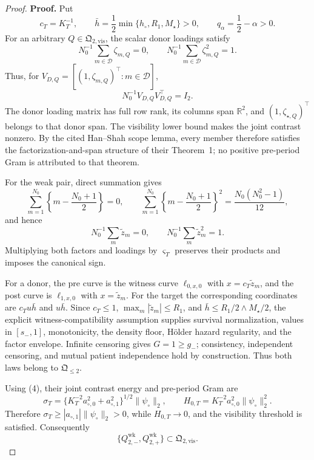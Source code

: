 \documentclass{article}
\begin{document}
\begin{proof}
\textbf{Proof.}
Put
\[
 c_T=K_T^{-1},
 \qquad \bar h=\frac12\min\{h_\circ,R_1,M_\star\}>0,
 \qquad q_\alpha=\frac12-\alpha>0.                       \tag{1}
\]
For an arbitrary \(Q\in\mathfrak Q_{2,\mathrm{vis}}\), the scalar donor loadings satisfy
\[
 N_0^{-1}\sum_{m\in\mathcal D}\zeta_{m,Q}=0,
 \qquad N_0^{-1}\sum_{m\in\mathcal D}\zeta_{m,Q}^2=1. \tag{2}
\]
Thus, for \(V_{D,Q}=[(1,\zeta_{m,Q})^\top:m\in\mathcal D]\),
\[
 N_0^{-1}V_{D,Q}V_{D,Q}^\top=I_2.                       \tag{3}
\]
The donor loading matrix has full row rank, its columns span \(\mathbb R^2\), and \((1,\zeta_{\star,Q})^\top\) belongs to that donor span.  The visibility lower bound makes the joint contrast nonzero.  By the cited Han--Shah scope lemma, every member therefore satisfies the factorization-and-span structure of their Theorem~1; no positive pre-period Gram is attributed to that theorem.

For the weak pair, direct summation gives
\[
 \sum_{m=1}^{N_0}\left\{m-\frac{N_0+1}{2}\right\}=0,
 \qquad
 \sum_{m=1}^{N_0}\left\{m-\frac{N_0+1}{2}\right\}^2
 =\frac{N_0(N_0^2-1)}{12},
\]
and hence
\[
 N_0^{-1}\sum_m\widetilde z_m=0,
 \qquad N_0^{-1}\sum_m\widetilde z_m^2=1.              \tag{4}
\]
Multiplying both factors and loadings by \(\varsigma_T\) preserves their products and imposes the canonical sign.

For a donor, the pre curve is the witness curve \(\ell_{0,x,0}\) with \(x=c_T\widetilde z_m\), and the post curve is \(\ell_{1,x,0}\) with \(x=\widetilde z_m\).  For the target the corresponding coordinates are \(c_Tu\bar h\) and \(u\bar h\).  Since \(c_T\le1\), \(\max_m|\widetilde z_m|\le R_1\), and \(\bar h\le R_1/2\wedge M_\star/2\), the explicit witness-compatibility assumption supplies survival normalization, values in \([s_-,1]\), monotonicity, the density floor, H\"older hazard regularity, and the factor envelope.  Infinite censoring gives \(G=1\ge g_-\); consistency, independent censoring, and mutual patient independence hold by construction.  Thus both laws belong to \(\mathfrak Q_{\le2}\).

Using (4), their joint contrast energy and pre-period Gram are
\[
 \sigma_T=\{K_T^{-2}a_{\circ,0}^2+a_{\circ,1}^2\}^{1/2}
 \|\psi_\circ\|_2,
 \qquad
 H_{0,T}=K_T^{-2}a_{\circ,0}^2\|\psi_\circ\|_2^2.      \tag{5}
\]
Therefore \(\sigma_T\ge|a_{\circ,1}|\|\psi_\circ\|_2>0\), while \(H_{0,T}\to0\), and the visibility threshold is satisfied.  Consequently
\[
 \{Q_{2,-}^{\mathrm{wk}},Q_{2,+}^{\mathrm{wk}}\}
 \subset\mathfrak Q_{2,\mathrm{vis}}.                   \tag{6}
\]


\end{proof}
\end{document}
